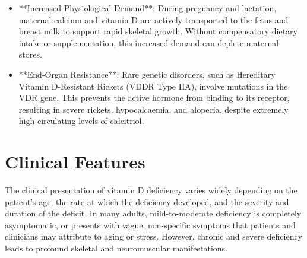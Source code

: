 \begin{itemize}
    \item **Increased Physiological Demand**: During pregnancy and lactation, maternal calcium and vitamin D are actively transported to the fetus and breast milk to support rapid skeletal growth. Without compensatory dietary intake or supplementation, this increased demand can deplete maternal stores.
    \item **End-Organ Resistance**: Rare genetic disorders, such as Hereditary Vitamin D-Resistant Rickets (VDDR Type IIA), involve mutations in the VDR gene. This prevents the active hormone from binding to its receptor, resulting in severe rickets, hypocalcaemia, and alopecia, despite extremely high circulating levels of calcitriol.
\end{itemize}

\section*{Clinical Features}
The clinical presentation of vitamin D deficiency varies widely depending on the patient's age, the rate at which the deficiency developed, and the severity and duration of the deficit. In many adults, mild-to-moderate deficiency is completely asymptomatic, or presents with vague, non-specific symptoms that patients and clinicians may attribute to aging or stress. However, chronic and severe deficiency leads to profound skeletal and neuromuscular manifestations.

